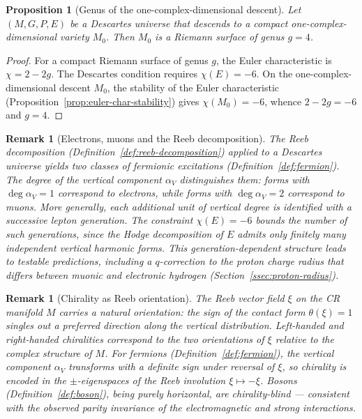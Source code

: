 \documentclass[12pt,a4paper]{report}
\newtheorem{proposition}[theorem]{Proposition}
\newtheorem{remark}[theorem]{Remark}
\begin{document}
\begin{proposition}[Genus of the one-complex-dimensional descent]
\label{prop:genus-maximal-descent}
Let $(M, G, P, E)$ be a Descartes universe that descends to a compact
one-complex-dimensional variety $M_0$.  Then $M_0$ is a Riemann surface of
genus $g = 4$.
\end{proposition}

\begin{proof}
For a compact Riemann surface of genus $g$, the Euler characteristic is
$\chi = 2 - 2g$.  The Descartes condition requires $\chi(E) = -6$.  On
the one-complex-dimensional descent $M_0$, the stability of the Euler characteristic
(Proposition~\ref{prop:euler-char-stability}) gives $\chi(M_0) = -6$,
whence $2 - 2g = -6$ and $g = 4$.
\end{proof}



\begin{remark}[Electrons, muons and the Reeb decomposition]
\label{rem:descartes-leptons}
The Reeb decomposition (Definition~\ref{def:reeb-decomposition}) applied to
a Descartes universe yields two classes of fermionic excitations
(Definition~\ref{def:fermion}).  The degree of the vertical component
$\alpha_V$ distinguishes them: forms with $\deg\alpha_V = 1$ correspond to
electrons, while forms with $\deg\alpha_V = 2$ correspond to muons.  More
generally, each additional unit of vertical degree is identified with a
successive lepton generation.  The constraint $\chi(E) = -6$ bounds the
number of such generations, since the Hodge decomposition of $E$ admits only
finitely many independent vertical harmonic forms.  This
generation-dependent structure leads to testable predictions, including a
$q$-correction to the proton charge radius that differs between muonic and
electronic hydrogen (Section~\ref{ssec:proton-radius}).
\end{remark}

\begin{remark}[Chirality as Reeb orientation]
\label{rem:descartes-chirality}
The Reeb vector field $\xi$ on the CR manifold $M$ carries a natural
orientation: the sign of the contact form $\theta(\xi) = 1$ singles out a
preferred direction along the vertical distribution.  Left-handed and
right-handed chiralities correspond to the two orientations of $\xi$ relative
to the complex structure of $M$.  For fermions
(Definition~\ref{def:fermion}), the vertical component $\alpha_V$ transforms
with a definite sign under reversal of $\xi$, so chirality is encoded in the
$\pm$-eigenspaces of the Reeb involution $\xi \mapsto -\xi$.  Bosons
(Definition~\ref{def:boson}), being purely horizontal, are chirality-blind ---
consistent with the observed parity invariance of the electromagnetic and
strong interactions.
\end{remark}
\end{document}
